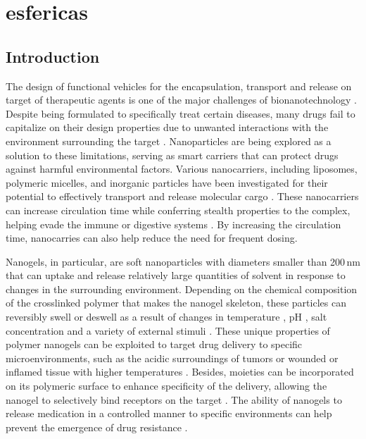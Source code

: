 \chapter{esfericas}

\section{Introduction}



    



The design of functional vehicles for the encapsulation, transport and release on target of therapeutic agents is one of the major challenges of bionanotechnology \addcite[ye2018review].
Despite being formulated to specifically treat certain diseases, many drugs fail to capitalize on their design properties due to  unwanted interactions with the environment surrounding the target .
Nanoparticles are being explored as a solution to these limitations, serving as smart carriers that can  protect drugs against harmful environmental factors.
Various nanocarriers, including liposomes, polymeric micelles, and inorganic particles have been investigated for their potential to effectively transport and release molecular cargo \addcite.
These nanocarriers can increase circulation time while conferring stealth properties to the complex, helping evade the immune or digestive systems \addcite.
By increasing the circulation time, nanocarries can also help reduce the need for frequent dosing.








Nanogels, in particular, are soft nanoparticles with diameters smaller than 200\,nm that can uptake and release relatively large quantities of solvent in response to changes in the surrounding environment.
Depending on the chemical composition of the crosslinked polymer that makes the nanogel skeleton, these particles can reversibly swell or deswell as a result of changes in temperature , pH , salt concentration  and a variety of external stimuli .
These unique properties of polymer nanogels can be exploited to target drug delivery to specific microenvironments, such as the acidic surroundings of tumors  or wounded or inflamed tissue with higher temperatures \addcite[wu2010core].
Besides, moieties can be incorporated on its polymeric surface to enhance specificity of the delivery, allowing the nanogel to selectively bind receptors on the target \addcite.
The ability of nanogels to release medication in a controlled manner to specific environments can help prevent the emergence of drug resistance \addcite.







